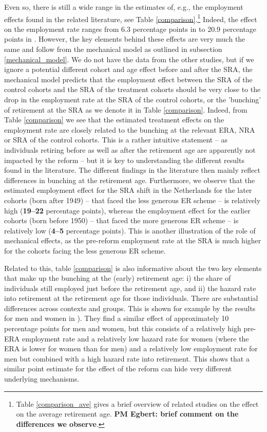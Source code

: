 \documentclass[12pt,a4paper]{article}
\begin{document}
Even so, there is still a wide range in the estimates of, e.g., the employment effects found in the related literature, see Table \ref{comparison}.\footnote{Table \ref{comparison_ave} gives a brief overview of related studies on the effect on the average retirement age. \textbf{PM Egbert: brief comment on the differences we observe}.} Indeed, the effect on the employment rate ranges from 6.3 percentage points in \cite{cribb2016signals} to 20.9 percentage points in \cite{rabate_employment_2019}. However, the key elements behind these effects are very much the same and follow from the mechanical model as outlined in subsection \ref{mechanical_model}. We do not have the data from the other studies, but if we ignore a potential different cohort and age effect before and after the SRA, the mechanical model predicts that the employment effect between the SRA of the control cohorts and the SRA of the treatment cohorts should be very close to the drop in the employment rate at the SRA of the control cohorts, or the 'bunching' of retirement at the SRA as we denote it in Table \ref{comparison}.     
Indeed, from Table \ref{comparison} we see that the estimated treatment effects on the employment rate are closely related to the bunching at the relevant ERA, NRA or SRA of the control cohorts. This is a rather intuitive statement -- as individuals retiring before as well as after the retirement age are apparently not impacted by the reform -- but it is key to understanding the different results found in the literature. The different findings in the literature then mainly reflect differences in bunching at the retirement age. Furthermore, we observe that the estimated employment effect for the SRA shift in the Netherlands for the later cohorts (born after 1949) -- that faced the less generous ER scheme -- is relatively high (\textbf{19--22} percentage points), whereas the employment effect for the earlier cohorts (born before 1950) -- that faced the more generous ER scheme -- is relatively low (\textbf{4--5} percentage points). This is another illustration of the role of mechanical effects, as the pre-reform employment rate at the SRA is much higher for the cohorts facing the less generous ER scheme.

Related to this, table \ref{comparison} is also informative about the two key elements that make up the bunching at the (early) retirement age: i) the share of individuals still employed just before the retirement age, and ii) the hazard rate into retirement at the retirement age for those individuals. 
There are substantial differences across contexts and groups. This is shown for example by the results for men and women in \cite{staubli_does_2013}). They find a similar effect of approximately 10 percentage points for men and women, but this consists of a relatively high pre-ERA employment rate and a relatively low hazard rate for women (where the ERA is lower for women than for men) and a relatively low employment rate for men but combined with a high hazard rate into retirement. This shows that a similar point estimate for the effect of the reform can hide very different underlying mechanisms.
\end{document}
